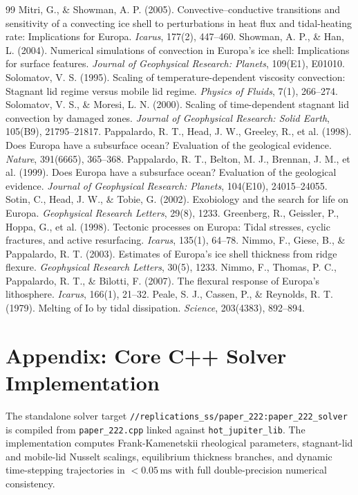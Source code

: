 \documentclass[11pt,a4paper]{article}
\begin{document}
\begin{thebibliography}{99}
 Mitri, G., \& Showman, A. P. (2005). Convective--conductive transitions and sensitivity of a convecting ice shell to perturbations in heat flux and tidal-heating rate: Implications for Europa. \textit{Icarus}, 177(2), 447--460.
 Showman, A. P., \& Han, L. (2004). Numerical simulations of convection in Europa's ice shell: Implications for surface features. \textit{Journal of Geophysical Research: Planets}, 109(E1), E01010.
 Solomatov, V. S. (1995). Scaling of temperature-dependent viscosity convection: Stagnant lid regime versus mobile lid regime. \textit{Physics of Fluids}, 7(1), 266--274.
 Solomatov, V. S., \& Moresi, L. N. (2000). Scaling of time-dependent stagnant lid convection by damaged zones. \textit{Journal of Geophysical Research: Solid Earth}, 105(B9), 21795--21817.
 Pappalardo, R. T., Head, J. W., Greeley, R., et al. (1998). Does Europa have a subsurface ocean? Evaluation of the geological evidence. \textit{Nature}, 391(6665), 365--368.
 Pappalardo, R. T., Belton, M. J., Brennan, J. M., et al. (1999). Does Europa have a subsurface ocean? Evaluation of the geological evidence. \textit{Journal of Geophysical Research: Planets}, 104(E10), 24015--24055.
 Sotin, C., Head, J. W., \& Tobie, G. (2002). Exobiology and the search for life on Europa. \textit{Geophysical Research Letters}, 29(8), 1233.
 Greenberg, R., Geissler, P., Hoppa, G., et al. (1998). Tectonic processes on Europa: Tidal stresses, cyclic fractures, and active resurfacing. \textit{Icarus}, 135(1), 64--78.
 Nimmo, F., Giese, B., \& Pappalardo, R. T. (2003). Estimates of Europa's ice shell thickness from ridge flexure. \textit{Geophysical Research Letters}, 30(5), 1233.
 Nimmo, F., Thomas, P. C., Pappalardo, R. T., \& Bilotti, F. (2007). The flexural response of Europa's lithosphere. \textit{Icarus}, 166(1), 21--32.
 Peale, S. J., Cassen, P., \& Reynolds, R. T. (1979). Melting of Io by tidal dissipation. \textit{Science}, 203(4383), 892--894.
\end{thebibliography}

\appendix
\section{Appendix: Core C++ Solver Implementation}
The standalone solver target \texttt{//replications\_ss/paper\_222:paper\_222\_solver} is compiled from \texttt{paper\_222.cpp} linked against \texttt{hot\_jupiter\_lib}. The implementation computes Frank-Kamenetskii rheological parameters, stagnant-lid and mobile-lid Nusselt scalings, equilibrium thickness branches, and dynamic time-stepping trajectories in $< 0.05\,\text{ms}$ with full double-precision numerical consistency.
\end{document}

